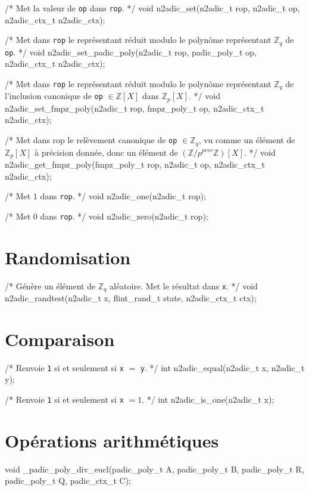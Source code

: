 \documentclass[11pt]{article}
\begin{document}
/* Met la valeur de \texttt{op} dans \texttt{rop}. */
void n2adic_set(n2adic_t rop, n2adic_t op, n2adic_ctx_t n2adic_ctx);

/* Met dans \texttt{rop} le représentant réduit modulo le polynôme représentant $\mathbb{Z}_q$ de \texttt{op}. */
void n2adic_set_padic_poly(n2adic_t rop, padic_poly_t op, n2adic_ctx_t n2adic_ctx);

/* Met dans \texttt{rop} le représentant réduit modulo le polynôme représentant $\mathbb{Z}_q$ de l'inclusion canonique de \texttt{op} $\in \mathbb{Z}[X]$ dans $\mathbb{Z}_p[X]$. */
void n2adic_set_fmpz_poly(n2adic_t rop, fmpz_poly_t op, n2adic_ctx_t n2adic_ctx);

/* Met dans rop le relèvement canonique de \texttt{op} $\in \mathbb{Z}_q$, vu comme un élément de $\mathbb{Z}_p[X]$ à précision donnée, donc un élément de $(\mathbb{Z}/p^{prec} \mathbb{Z})[X]$. */
void n2adic_get_fmpz_poly(fmpz_poly_t rop, n2adic_t op, n2adic_ctx_t n2adic_ctx);

/* Met $1$ dans \texttt{rop}. */
void n2adic_one(n2adic_t rop);

/* Met $0$ dans \texttt{rop}. */
void n2adic_zero(n2adic_t rop);


\section{Randomisation}

/* Génère un élément de $\mathbb{Z}_q$ aléatoire. Met le résultat dans \texttt{x}. */
void n2adic_randtest(n2adic_t x, flint_rand_t state, n2adic_ctx_t ctx);


\section{Comparaison}

/* Renvoie \texttt{1} si et seulement si \texttt{x} $=$ \texttt{y}. */
int n2adic_equal(n2adic_t x, n2adic_t y);

/* Renvoie \texttt{1} si et seulement si \texttt{x} $= 1$. */
int n2adic_is_one(n2adic_t x);


\section{Opérations arithmétiques}
void _padic_poly_div_eucl(padic_poly_t A, padic_poly_t B, padic_poly_t R, padic_poly_t Q, padic_ctx_t C);
\end{document}
